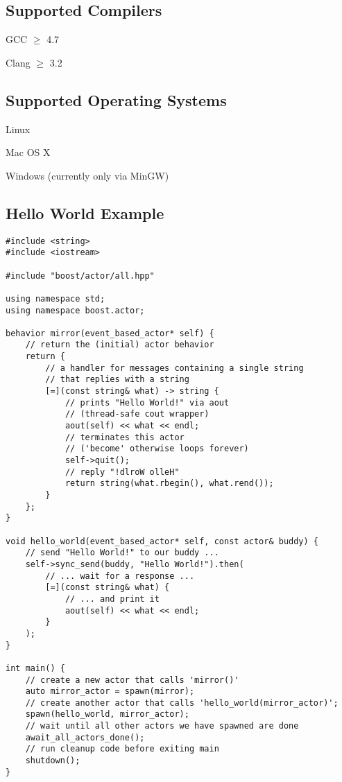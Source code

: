 \subsection{Supported Compilers}

\begin{itemize*}
  \item GCC $\ge$ 4.7
  \item Clang $\ge$ 3.2
\end{itemize*}

\subsection{Supported Operating Systems}

\begin{itemize*}
\item Linux
\item Mac OS X
\item Windows (currently only via MinGW)
\end{itemize*}

\clearpage
\subsection{Hello World Example}

\begin{lstlisting}
#include <string>
#include <iostream>

#include "boost/actor/all.hpp"

using namespace std;
using namespace boost.actor;

behavior mirror(event_based_actor* self) {
    // return the (initial) actor behavior
    return {
        // a handler for messages containing a single string
        // that replies with a string
        [=](const string& what) -> string {
            // prints "Hello World!" via aout
            // (thread-safe cout wrapper)
            aout(self) << what << endl;
            // terminates this actor
            // ('become' otherwise loops forever)
            self->quit();
            // reply "!dlroW olleH"
            return string(what.rbegin(), what.rend());
        }
    };
}

void hello_world(event_based_actor* self, const actor& buddy) {
    // send "Hello World!" to our buddy ...
    self->sync_send(buddy, "Hello World!").then(
        // ... wait for a response ...
        [=](const string& what) {
            // ... and print it
            aout(self) << what << endl;
        }
    );
}

int main() {
    // create a new actor that calls 'mirror()'
    auto mirror_actor = spawn(mirror);
    // create another actor that calls 'hello_world(mirror_actor)';
    spawn(hello_world, mirror_actor);
    // wait until all other actors we have spawned are done
    await_all_actors_done();
    // run cleanup code before exiting main
    shutdown();
}
\end{lstlisting}
